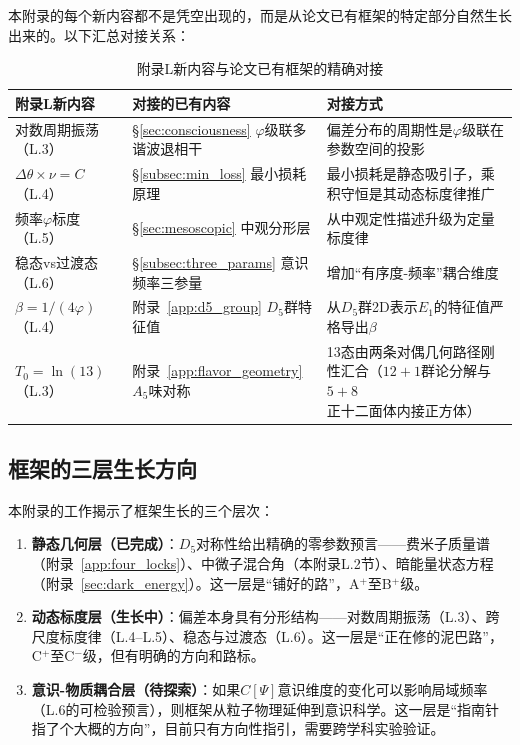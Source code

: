 \documentclass[12pt,a4paper,twocolumn]{article}
\renewcommand{\phi}{\varphi}
\begin{document}
本附录的每个新内容都不是凭空出现的，而是从论文已有框架的特定部分自然生长出来的。以下汇总对接关系：

\begin{table}[htbp]
\centering
\caption{附录L新内容与论文已有框架的精确对接}
\label{tab:docking_points}
\begin{tabular}{llp{6cm}}
\hline
附录L新内容 & 对接的已有内容 & 对接方式 \\
\hline
对数周期振荡（L.3） & \S\ref{sec:consciousness} $\phi$级联多谐波退相干 & 偏差分布的周期性是$\phi$级联在参数空间的投影 \\
$\Delta\theta \times \nu = C$（L.4） & \S\ref{subsec:min_loss} 最小损耗原理 & 最小损耗是静态吸引子，乘积守恒是其动态标度律推广 \\
频率$\phi$标度（L.5） & \S\ref{sec:mesoscopic} 中观分形层 & 从中观定性描述升级为定量标度律 \\
稳态vs过渡态（L.6） & \S\ref{subsec:three_params} 意识频率三参量 & 增加``有序度-频率''耦合维度 \\
$\beta = 1/(4\phi)$（L.4） & 附录~\ref{app:d5_group} $D_5$群特征值 & 从$D_5$群2D表示$E_1$的特征值严格导出$\beta$ \\
$T_0 = \ln(13)$（L.3） & 附录~\ref{app:flavor_geometry} $A_5$味对称 & 13态由两条对偶几何路径刚性汇合（$12+1$群论分解与$5+8$正十二面体内接正方体） \\
\hline
\end{tabular}
\end{table}

\subsection{框架的三层生长方向}
\label{subsec:three_layers}

本附录的工作揭示了框架生长的三个层次：

\begin{enumerate}
\item \textbf{静态几何层（已完成）}：$D_5$对称性给出精确的零参数预言——费米子质量谱（附录~\ref{app:four_locks}）、中微子混合角（本附录L.2节）、暗能量状态方程（附录~\ref{sec:dark_energy}）。这一层是``铺好的路''，A$^+$至B$^+$级。

\item \textbf{动态标度层（生长中）}：偏差本身具有分形结构——对数周期振荡（L.3）、跨尺度标度律（L.4--L.5）、稳态与过渡态（L.6）。这一层是``正在修的泥巴路''，C$^+$至C$^-$级，但有明确的方向和路标。

\item \textbf{意识-物质耦合层（待探索）}：如果$C[\Psi]$意识维度的变化可以影响局域频率（L.6的可检验预言），则框架从粒子物理延伸到意识科学。这一层是``指南针指了个大概的方向''，目前只有方向性指引，需要跨学科实验验证。
\end{enumerate}
\end{document}
